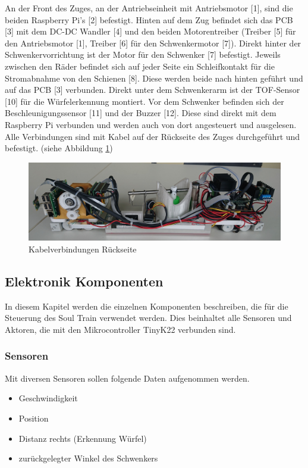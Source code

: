 \documentclass[../../main.tex]{subfiles}
\begin{document}
    An der Front des Zuges, an der Antriebseinheit mit Antriebsmotor [1], sind die beiden Raspberry Pi's [2] befestigt. Hinten auf dem Zug befindet sich das PCB [3] mit dem DC-DC Wandler [4] und den beiden Motorentreiber (Treiber [5] für den Antriebsmotor [1], Treiber [6] für den Schwenkermotor [7]). Direkt hinter der Schwenkervorrichtung ist der Motor für den Schwenker [7] befestigt. Jeweils zwischen den Räder befindet sich auf jeder Seite ein Schleifkontakt für die Stromabnahme von den Schienen [8]. Diese werden beide nach hinten geführt und auf das PCB [3] verbunden. Direkt unter dem Schwenkerarm ist der TOF-Sensor [10] für die Würfelerkennung montiert. Vor dem Schwenker befinden sich der Beschleunigungssensor [11] und der Buzzer [12]. Diese sind direkt mit dem Raspberry Pi verbunden und werden auch von dort angesteuert und ausgelesen.\\
     Alle Verbindungen sind mit Kabel auf der Rückseite des Zuges durchgeführt und befestigt. (siehe Abbildung \ref{fig:et_kabel})\\

    \begin{figure}[H]
        \centering
        \includegraphics[width=1.0\textwidth]{../../images/et/et_kabel.jpg}
        \caption {Kabelverbindungen Rückseite}
        \label{fig:et_kabel}
    \end{figure}

    \subsection{Elektronik Komponenten} \label{et_Komponenten}
    In diesem Kapitel werden die einzelnen Komponenten beschreiben, die für die Steuerung des Soul Train verwendet werden. Dies beinhaltet alle Sensoren und Aktoren, die mit den Mikrocontroller TinyK22 verbunden sind.

    \subsubsection{Sensoren} \label{et_sensoren}
    Mit diversen Sensoren sollen folgende Daten aufgenommen werden.
    \begin{itemize}
        \item Geschwindigkeit
        \item Position
        \item Distanz rechts (Erkennung Würfel)
        \item zurückgelegter Winkel des Schwenkers
    \end{itemize}
\end{document}
